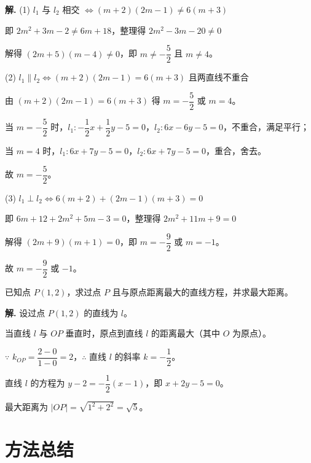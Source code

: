 \documentclass[11pt]{ctexrep}
\begin{document}
\textbf{解.} (1) $l_1$ 与 $l_2$ 相交 $\Leftrightarrow (m + 2)(2m - 1) \neq 6(m + 3)$

即 $2m^2 + 3m - 2 \neq 6m + 18$，整理得 $2m^2 - 3m - 20 \neq 0$

解得 $(2m + 5)(m - 4) \neq 0$，即 $m \neq -\dfrac{5}{2}$ 且 $m \neq 4$。

(2) $l_1 \parallel l_2 \Leftrightarrow (m + 2)(2m - 1) = 6(m + 3)$ 且两直线不重合

由 $(m + 2)(2m - 1) = 6(m + 3)$ 得 $m = -\dfrac{5}{2}$ 或 $m = 4$。

当 $m = -\dfrac{5}{2}$ 时，$l_1: -\dfrac{1}{2}x + \dfrac{1}{2}y - 5 = 0$，$l_2: 6x - 6y - 5 = 0$，不重合，满足平行；

当 $m = 4$ 时，$l_1: 6x + 7y - 5 = 0$，$l_2: 6x + 7y - 5 = 0$，重合，舍去。

故 $m = \boxed{-\dfrac{5}{2}}$。

(3) $l_1 \perp l_2 \Leftrightarrow 6(m + 2) + (2m - 1)(m + 3) = 0$

即 $6m + 12 + 2m^2 + 5m - 3 = 0$，整理得 $2m^2 + 11m + 9 = 0$

解得 $(2m + 9)(m + 1) = 0$，即 $m = -\dfrac{9}{2}$ 或 $m = -1$。

故 $m = \boxed{-\dfrac{9}{2}}$ 或 $\boxed{-1}$。

\begin{realexam}[2025 上海高考真题汇编]
    已知点 $P(1, 2)$，求过点 $P$ 且与原点距离最大的直线方程，并求最大距离。
\end{realexam}

\textbf{解.} 设过点 $P(1, 2)$ 的直线为 $l$。

当直线 $l$ 与 $OP$ 垂直时，原点到直线 $l$ 的距离最大（其中 $O$ 为原点）。

$\because$ $k_{OP} = \dfrac{2 - 0}{1 - 0} = 2$，$\therefore$ 直线 $l$ 的斜率 $k = -\dfrac{1}{2}$。

直线 $l$ 的方程为 $y - 2 = -\dfrac{1}{2}(x - 1)$，即 $\boxed{x + 2y - 5 = 0}$。

最大距离为 $|OP| = \sqrt{1^2 + 2^2} = \boxed{\sqrt{5}}$。

\section*{方法总结}
\end{document}
